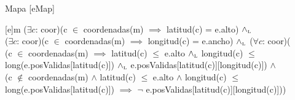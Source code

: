 \begin{Representacion}

	\begin{Estructura}{ Mapa }[eMap]
		\begin{Tupla}[eMap]
		\end{Tupla}
	\end{Estructura}




	{m}
	{
		($\exists c$: coor)(c $\in$ coordenadas(m) $\implies$ latitud(c) = e.alto) $\land_{\mathrm{\scriptscriptstyle{L}}}$ \\
		($\exists c$: coor)(c $\in$ coordenadas(m) $\implies$ longitud(c) = e.ancho) $\land_{\mathrm{\scriptscriptstyle{L}}}$ 
		($\forall c$: coor)( \\
			(c $\in$ coordenadas(m) $\implies$ 
				latitud(c) $\leq$ e.alto $\land_{\mathrm{\scriptscriptstyle{L}}}$
				longitud(c) $\leq$ long(e.posValidas[latitud(c)]) $\land_{\mathrm{\scriptscriptstyle{L}}}$ 
				e.posValidas[latitud(c)][longitud(c)]) $\land$ \\
			(c $\not\in$ coordenadas(m) $\land$ latitud(c) $\leq$ e.alto $\land$ longitud(c) $\leq$ long(e.posValidas[latitud(c)]) $\implies$ $\neg$ e.posValidas[latitud(c)][longitud(c)]))
	}
\end{Representacion}

